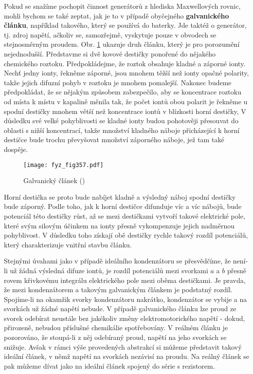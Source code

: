   Pokud se snažíme pochopit činnost generátorů z hlediska Maxwellových rovnic, mohli bychom se také 
  zeptat, jak je to v případě obyčejného \textbf{galvanického článku}, například takového, který se 
  používá do baterky. Jde taktéž o generátor, tj. zdroj napětí, ačkoliv se, samozřejmě, vyskytuje 
  pouze v obvodech se stejnosměrným proudem. Obr. \ref{fyz:fig357} ukazuje druh článku, který je 
  pro porozumění nejednodušší. Představme si dvě kovové destičky ponořené do nějakého chemického 
  roztoku. Předpokládejme, že roztok obsahuje kladné a záporné ionty. Nechť jedny ionty, řekněme 
  záporné, jsou mnohem těžší než ionty opačné polarity, takže jejich difuzní pohyb v roztoku je 
  mnohem pomalejší. Nakonec budeme předpokládat, že se nějakým způsobem zabezpečilo, aby se 
  koncentrace roztoku od místa k místu v kapalině měnila tak, že počet iontů obou polarit je 
  řekněme u spodní destičky mnohem větší než koncentrace iontů v blízkosti horní destičky, V 
  důsledku své velké pohyblivosti se kladné ionty budou pohotověji přesouvat do oblasti s nižší 
  koncentrací, takže množství kladného náboje přicházející k horní destičce bude trochu převyšovat 
  množství záporného náboje, jež tam také dospěje.

  \begin{figure}[ht!] %
    \centering
    \texttt{[image: fyz\_fig357.pdf]}
    \caption{Galvanický článek
             (\cite[s.~398]{Feynman02})}
    \label{fyz:fig357}
  \end{figure}
  
  Horní destička se proto bude nabíjet kladně a výsledný náboj spodní destičky bude záporný. Podle 
  toho, jak k horní destičce difunduje víc a víc nábojů, bude potenciál této destičky růst, až se 
  mezi destičkami vytvoří takové elektrické pole, které svým silovým účinkem na ionty přesně 
  vykompenzuje jejich nadměrnou pohyblivost. V důsledku toho získají obě destičky rychle takový 
  rozdíl potenciálů, který charakterizuje vnitřní stavbu článku.
  
  Stejnými úvahami jako v případě ideálního kondenzátoru se přesvědčíme, že není-li už žádná 
  výsledná difuze iontů, je rozdíl potenciálů mezi svorkami \(a\) a \(b\) přesně rovem křivkovému 
  integrálu elektrického pole mezi oběma destičkami. Je pravda, že mezi kondenzátorem a takovým 
  galvanickým článkem je podstatný rozdíl. Spojíme-li na okamžik svorky kondenzátoru nakrátko, 
  kondenzátor se vybije a na svorkách už žádné napětí nebude. V případě galvanického článku lze 
  proud ze svorek odebírat neustále bez jakékoliv změny elektromotorického napětí - dokud, 
  přirozeně, nebudou příslušné chemikálie spotřebovány. V reálném článku je pozorováno, že 
  stoupá-li z něj odebíraný proud, napětí na jeho svorkách se snižuje. Avšak v rámci výše 
  provedených abstrakcí si můžeme představit takový ideální článek, v němž napětí na svorkách 
  nezávisí na proudu. Na reálný článek se pak můžeme dívat jako na ideální článek spojený do série 
  s rezistorem.
  
